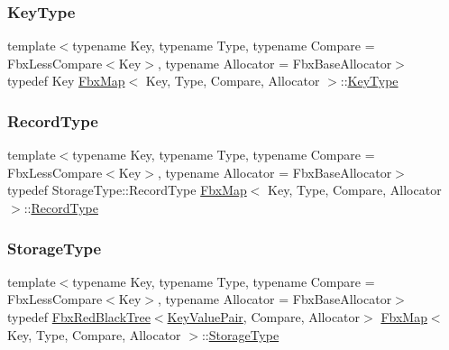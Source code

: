 \mbox{\label{class_fbx_map_ad8392c83b6f8eeb9e0706bcc8674270a}} 
\subsubsection{\texorpdfstring{Key\+Type}{KeyType}}
{\footnotesize\ttfamily template$<$typename Key, typename Type, typename Compare = Fbx\+Less\+Compare$<$\+Key$>$, typename Allocator = Fbx\+Base\+Allocator$>$ \\
typedef Key \hyperlink{class_fbx_map}{Fbx\+Map}$<$ Key, Type, Compare, Allocator $>$\+::\hyperlink{class_fbx_map_ad8392c83b6f8eeb9e0706bcc8674270a}{Key\+Type}}

\mbox{\label{class_fbx_map_af8fc887461b3bf29f41aa36d15ddb54f}} 
\subsubsection{\texorpdfstring{Record\+Type}{RecordType}}
{\footnotesize\ttfamily template$<$typename Key, typename Type, typename Compare = Fbx\+Less\+Compare$<$\+Key$>$, typename Allocator = Fbx\+Base\+Allocator$>$ \\
typedef Storage\+Type\+::\+Record\+Type \hyperlink{class_fbx_map}{Fbx\+Map}$<$ Key, Type, Compare, Allocator $>$\+::\hyperlink{class_fbx_map_af8fc887461b3bf29f41aa36d15ddb54f}{Record\+Type}}

\mbox{\label{class_fbx_map_ad7e4fa113e167dfd44f52993fa302c2d}} 
\subsubsection{\texorpdfstring{Storage\+Type}{StorageType}}
{\footnotesize\ttfamily template$<$typename Key, typename Type, typename Compare = Fbx\+Less\+Compare$<$\+Key$>$, typename Allocator = Fbx\+Base\+Allocator$>$ \\
typedef \hyperlink{class_fbx_red_black_tree}{Fbx\+Red\+Black\+Tree}$<$\hyperlink{class_fbx_map_1_1_key_value_pair}{Key\+Value\+Pair}, Compare, Allocator$>$ \hyperlink{class_fbx_map}{Fbx\+Map}$<$ Key, Type, Compare, Allocator $>$\+::\hyperlink{class_fbx_map_ad7e4fa113e167dfd44f52993fa302c2d}{Storage\+Type}\hspace{0.3cm}{\ttfamily [protected]}}



